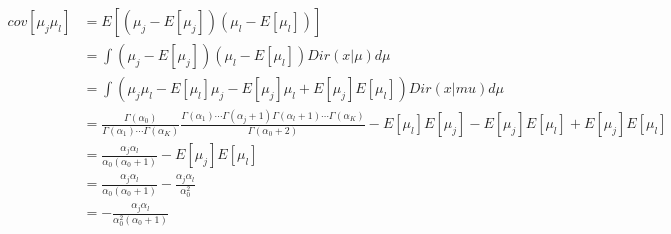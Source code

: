 \documentclass[12pt]{article}
\begin{document}
    \begin{align*}
        cov[\mu_j\mu_l] & = E[(\mu_j - E[\mu_j])(\mu_l - E[\mu_l])] \\
        & = \int(\mu_j - E[\mu_j])(\mu_l - E[\mu_l])Dir(x|\mu) d\mu \\
        & = \int(\mu_j\mu_l - E[\mu_l]\mu_j - E[\mu_j]\mu_l + E[\mu_j]E[\mu_l])Dir(x|mu) d\mu \\
        & = \frac{\Gamma(\alpha_0)}{\Gamma(\alpha_1)\cdots\Gamma(\alpha_K)} \frac{\Gamma(\alpha_1)\cdots\Gamma(\alpha_j + 1)\Gamma(\alpha_l + 1)\cdots\Gamma(\alpha_K)}{\Gamma(\alpha_0 + 2)}
            - E[\mu_l]E[\mu_j] - E[\mu_j]E[\mu_l] + E[\mu_j]E[\mu_l] \\
        & = \frac{\alpha_j\alpha_l}{\alpha_0(\alpha_0 + 1)} - E[\mu_j]E[\mu_l] \\
        & = \frac{\alpha_j\alpha_l}{\alpha_0(\alpha_0 + 1)} - \frac{\alpha_j\alpha_l}{\alpha_0^2} \\
        & = -\frac{\alpha_j\alpha_l}{\alpha_0^2(\alpha_0 + 1)}
    \end{align*} 
\end{document}
